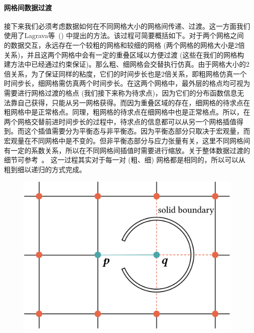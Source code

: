 \paragraph{网格间数据过渡}
接下来我们必须考虑数据如何在不同网格大小的网格间传递、过渡。这一方面我们使用了Lagrava等~(\citeyear{Lagrava-2012}) 中提出的方法。该过程可简要概括如下。对于两个网格之间的数据交互，永远存在一个较粗的网格和较细的网格 (两个网格的网格大小是2倍关系)，并且这两个网格中会有一定的重叠区域以方便过渡 (这些在我们的网格构建方法中已经通过约束保证)。那么粗、细网格会交替执行仿真。由于网格大小的2倍关系，为了保证同样的粘度，它们的时间步长也是2倍关系，即粗网格仿真一个时间步长，细网格需仿真两个时间步长。在这两个网格中，最外层的格点均可视为需要进行网格过渡的格点 (我们接下来称为待求点)，因为它们的分布函数信息无法靠自己获得，只能从另一网格获得。而因为重叠区域的存在，细网格的待求点在粗网格中是正常格点。同理，粗网格的待求点在细网格中也是正常格点。所以，在两个网格交替前进时间步长的过程中，待求点的信息都可以从另一个网格插值得到。而这个插值需要分为平衡态与非平衡态。因为平衡态部分只取决于宏观量，而宏观量在不同网格中是不变的。但非平衡态部分与应力张量有关，这里不同网格间有一定的系数关系，所以在不同网格间插值时需要进行缩放。关于整体数据过渡的细节可参考~\cite{Lagrava-2012}。
这一过程其实对于每一对 (粗、细) 网格都是相同的，所以可以从粗到细以递归的方式完成。

\begin{figure}[htb]
    \centering
      \includegraphics[width=0.7\columnwidth]{figures/propagation.png}
    \label{img:propagation}
\end{figure}


